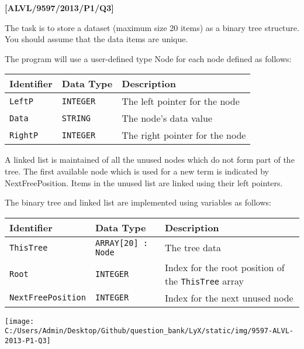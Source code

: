 \quad{}
\item \textbf{{[}ALVL/9597/2013/P1/Q3{]} }

The task is to store a dataset (maximum size 20 items) as a binary
tree structure. You should assume that the data items are unique.

The program will use a user-defined type Node for each node defined
as follows:
\begin{center}
\begin{tabular}{|l|l|l|}
\hline 
\texttt{\hspace{0.01\columnwidth}}Identifier & \texttt{\hspace{0.01\columnwidth}}Data Type & \texttt{\hspace{0.05\columnwidth}}Description\tabularnewline
\hline 
\texttt{LeftP} & \texttt{INTEGER} & The left pointer for the node\tabularnewline
\hline 
\texttt{Data} & \texttt{STRING} & The node's data value\tabularnewline
\hline 
\texttt{RightP} & \texttt{INTEGER } & The right pointer for the node\tabularnewline
\hline 
\end{tabular}
\par\end{center}

A linked list is maintained of all the unused nodes which do not form
part of the tree. The first available node which is used for a new
term is indicated by NextFreePosition. Items in the unused list are
linked using their left pointers.

The binary tree and linked list are implemented using variables as
follows:
\begin{center}
\begin{tabular}{|l|l|l|}
\hline 
\texttt{\hspace{0.01\columnwidth}}Identifier & \texttt{\hspace{0.01\columnwidth}}Data Type & \texttt{\hspace{0.05\columnwidth}}Description\tabularnewline
\hline 
\texttt{ThisTree} & \texttt{ARRAY{[}20{]} : Node} & The tree data\tabularnewline
\hline 
\texttt{Root } & \texttt{INTEGER} & Index for the root position of the \texttt{ThisTree} array\tabularnewline
\hline 
\texttt{NextFreePosition} & \texttt{INTEGER } & Index for the next unused node\tabularnewline
\hline 
\end{tabular}
\par\end{center}

\begin{center}
\texttt{[image: C:/Users/Admin/Desktop/Github/question\_bank/LyX/static/img/9597-ALVL-2013-P1-Q3]}
\par\end{center}

